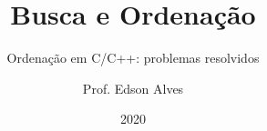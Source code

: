 \title{Busca e Ordenação}
\subtitle{Ordenação em C/C++: problemas resolvidos}
\date{2020}
\author{Prof. Edson Alves}
